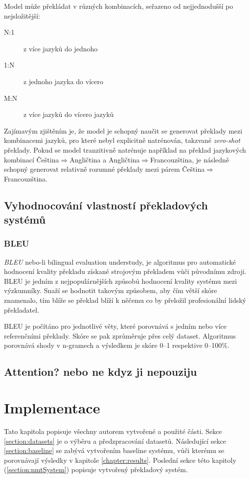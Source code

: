 Model může překládat v různých kombinacích, seřazeno od nejjednodušší po nejsložitější:
\begin{description}
  \item[N:1] z více jazyků do jednoho
  \item[1:N] z jednoho jazyka do vícero
  \item[M:N] z více jazyků do vícero jazyků
\end{description}

Zajímavým zjištěním je, že model je schopný naučit se generovat překlady mezi kombinacemi jazyků, pro které nebyl explicitně natrénován, takzvané \emph{zero-shot} překlady. Pokud se model tranzitivně natrénuje například na překlad jazykových kombinací Čeština$\Rightarrow$Angličtina a Angličtina$\Rightarrow$Francouzština, je následně schopný generovat relativně rozumné překlady mezi párem Čeština$\Rightarrow$Francouzština.


\section{Vyhodnocování vlastností překladových systémů}

\subsection{BLEU} \label{subsection:bleu}
\emph{BLEU} \cite{BLEU} nebo-li bilingual evaluation understudy, je algoritmus pro automatické hodnocení kvality překladu získané strojovým překladem vůči původnímu zdroji. BLEU je jedním z nejpopulárnějších způsobů hodnocení kvality systému mezi výzkumníky. Snaží se hodnotit takovým způsobem, aby čím větší skóre znamenalo, tím blíže se překlad blíží k něčemu co by přeložil profesionální lidský překladatel.

BLEU je počítáno pro jednotlivé věty, které porovnává s jedním nebo více referenčními překlady. Skóre se pak zprůměruje přes celý dataset. Algoritmus porovnává shody v n-gramech a výsledkem je skóre 0--1 respektive 0--100\%.



\section{Attention? nebo ne kdyz ji nepouziju}

\chapter{Implementace} \label{chapter:implementation}
Tato kapitola popisuje všechny autorem vytvořené a použité části. Sekce \ref{section:datasets} je o výběru a předzpracování datasetů. Následující sekce \ref{section:baseline} se zabývá vytvořením baseline systému, vůči kterému se porovnávají výsledky v kapitole \ref{chapter:results}. Poslední sekce této kapitoly (\ref{section:nmtSystem}) popisuje vytvořený překladový systém.

